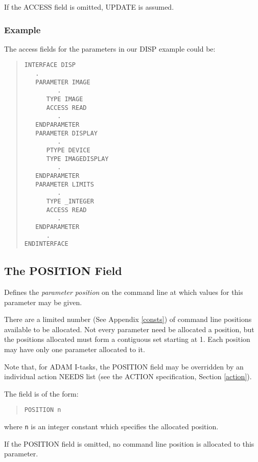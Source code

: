 \documentclass[twoside,11pt]{article}
\newcommand{\xlabel}[1]{}
\renewcommand{\_}{\texttt{\symbol{95}}}
\begin{document}
If the ACCESS field is omitted, UPDATE is assumed.

\subsubsection*{Example}
The access fields for the parameters in our DISP example could be:
\begin{quote} \begin{verbatim}
INTERFACE DISP
   .
   PARAMETER IMAGE
         .
      TYPE IMAGE
      ACCESS READ
         .
   ENDPARAMETER
   PARAMETER DISPLAY
         .
      PTYPE DEVICE
      TYPE IMAGEDISPLAY
         .
   ENDPARAMETER
   PARAMETER LIMITS
         .
      TYPE _INTEGER
      ACCESS READ
         .
   ENDPARAMETER
      .
ENDINTERFACE
\end{verbatim} \end{quote}

\subsection{The POSITION Field\xlabel{the_position_field}}

Defines the {\em parameter position} on the command line at which values for
this parameter may be given.

There are a limited number (See Appendix \ref{consts}) of
command line positions available to be allocated. Not every parameter need
be allocated a position, but the positions allocated must form a contiguous
set starting at 1.
Each position may have only one parameter allocated to it.

Note that, for ADAM I-tasks, the POSITION field may be overridden by an
individual action NEEDS list (see the ACTION specification, Section
\ref{action}).

The field is of the form:
\begin{quote} \begin{verbatim}
POSITION n
\end{verbatim} \end{quote}
where \texttt{n} is an integer constant which specifies the allocated position.

If the POSITION field is omitted, no command line position is allocated to this
parameter.
\end{document}

